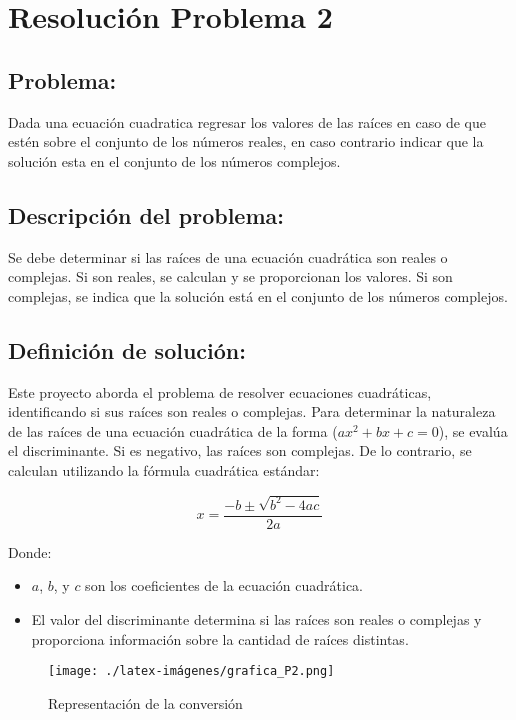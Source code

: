 \section{Resolución Problema 2} 
\subsection{Problema:}
Dada una ecuación cuadratica regresar los valores de las raíces en caso de que estén sobre el conjunto de los números reales, en caso contrario indicar que la solución esta en el conjunto de los números complejos. 

\subsection{\textbf{Descripción del problema:}}
Se debe determinar si las raíces de una ecuación cuadrática 
son reales o complejas. Si son reales, se calculan y 
se proporcionan los valores. Si son complejas, se 
indica que la solución está en el conjunto de los números complejos.

\subsection{\textbf{Definición de solución:}}
Este proyecto aborda el problema de resolver ecuaciones cuadráticas, identificando si sus raíces son reales o complejas. 
Para determinar la naturaleza de las raíces de una ecuación cuadrática de la forma  (\(ax^2 + bx + c = 0\)), se evalúa el discriminante. Si es negativo, las raíces son complejas. De lo contrario, se calculan utilizando la fórmula cuadrática estándar:

\[ x = \frac{-b \pm \sqrt{b^2 - 4ac}}{2a} \]

Donde:
\begin{itemize}
    \item \(a\), \(b\), y \(c\) son los coeficientes de la ecuación cuadrática.
    \item El valor del discriminante determina si las raíces son reales o complejas y proporciona información sobre la cantidad de raíces distintas.
\end{itemize}


\begin{figure}[h!]
    \centering
    \texttt{[image: ./latex-imágenes/grafica\_P2.png]}
    \caption{Representación de la conversión}
    \label{fig: Grafica Ecuacion Recta}
\end{figure}

